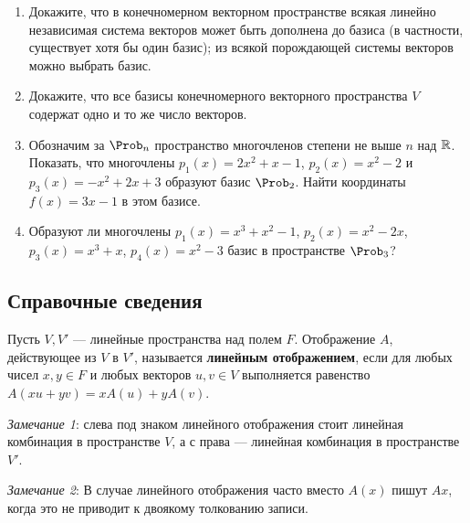 \begin{enumerate}
\item Докажите, что в конечномерном векторном пространстве
\ipunkt всякая линейно независимая система векторов может быть дополнена до базиса (в частности,
существует хотя бы один базис);
\ipunkt из всякой порождающей системы векторов можно выбрать базис.

\item Докажите, что все базисы конечномерного векторного пространства $V$ содержат одно и
то же число векторов.

\item Обозначим за $\P_n$ пространство многочленов степени не выше $n$ над $\mathbb R$.  Показать, что многочлены $p_1(x)=2x^2+x-1$, $p_2(x)=x^2-2$ и $p_3(x)=-x^2+2x+3$ образуют базис $\P_2$. Найти координаты $f(x)=3x-1$ в этом базисе.

\item Образуют ли многочлены $p_1(x)=x^3+x^2-1$, $p_2(x)=x^2-2x$, $p_3(x)=x^3+x$, $p_4(x)=x^2-3$ базис в пространстве $\P_3$?

\end{enumerate}




\setcounter{chapter}{68}

\subsection*{Справочные сведения}

Пусть $V,V'$ --- линейные пространства над полем $F$.
Отображение $A$, действующее из $V$ в $V'$, называется \textbf{линейным отображением},
если для любых чисел $x,y\in F$ и любых векторов $u,v \in V$
выполняется равенство $A(xu + yv) = xA(u) + yA(v)$.

\textit{Замечание 1}: слева под знаком линейного отображения стоит линейная комбинация в пространстве $V$, а с права --- линейная комбинация в пространстве $V'$. 

\textit{Замечание 2}: В случае линейного отображения часто вместо $A(x)$ пишут $Ax$, когда это не приводит к двоякому толкованию записи.

